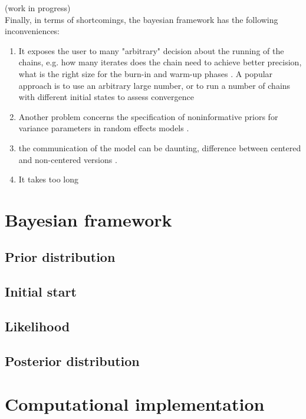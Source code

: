 {\color{red} (work in progress) \\
\noindent Finally, in terms of shortcomings, the bayesian framework has the following inconveniences:

\begin{enumerate}	
	\item It exposes the user to many "arbitrary" decision about the running of the chains, e.g. how many iterates does the chain need to achieve better precision, what is the right size for the burn-in and warm-up phases \cite{Skrondal_et_al_2004a}. A popular approach is to use an arbitrary large number, or to run a number of chains with different initial states to assess convergence
	
	\item Another problem concerns the speciﬁcation of noninformative priors for
	variance parameters in random effects models \cite{Skrondal_et_al_2004a}.
	
	\item the communication of the model can be daunting, difference between centered and non-centered versions \cite{McElreath_2020}.
	
	\item It takes too long 
		
\end{enumerate}

}


\section{Bayesian framework}

\subsection{Prior distribution}

\subsection{Initial start}

\subsection{Likelihood}

\subsection{Posterior distribution}


\section{Computational implementation}

